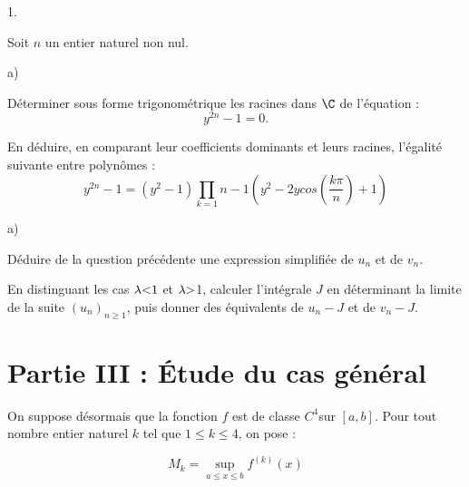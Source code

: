 \documentclass[11pt]{article}%
\begin{document}
\begin{noliste}{1.}
 \setlength{\itemsep}{4mm}
\item Soit $n$ un entier naturel non nul.

\begin{noliste}{a)}
 \setlength{\itemsep}{2mm}
\item Déterminer sous forme trigonométrique les racines dans $\C$ de
l'équation :
\[
y^{2n}-1 = 0.
\]

\item En déduire, en comparant leur coefficients dominants et leurs
racines,
l'égalité suivante entre polynômes :
\[
y^{2n}-1 = (y^{2}-1)\prod\limits_{k = 1}{n-1}\left( y^{2}-2ycos\left(
\dfrac{k\pi }{n}\right) + 1\right)
\]
\end{noliste}

\item 

\begin{noliste}{a)}
 \setlength{\itemsep}{2mm}
\item Déduire de la question précédente une expression simplifiée de
$u_{n}$
et de $v_{n}$.

\item En distinguant les cas $\lambda {\large <}1$ et $\lambda {\large
>}$1,
calculer l'intégrale $J$ en déterminant la limite de la suite
$(u_{n})_{n\geq 1}$, puis donner des équivalents de $u_{n}-J$ et de
$v_{n}-J$.
\end{noliste}
\end{noliste}

\section*{Partie III : Étude du cas général}

On suppose désormais que la fonction $f$ est de classe $C^{4}$sur
$[a,b]$.
Pour tout nombre entier naturel $k$ tel que $1\leq k\leq 4$, on
pose :

\begin{center}
\[
M_{k} = \sup\limits_{a\leq x\leq b}f^{(k)}(x)
\]
\end{center}
\end{document}
